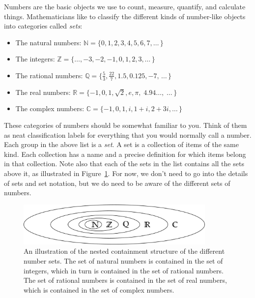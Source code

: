 		Numbers are the basic objects we use to count, measure, quantify, and calculate things.
		Mathematicians like to classify the different kinds of number-like objects into categories called \emph{sets}:					
		\begin{itemize}
			\item  The natural numbers: $\mathbb{N} = \{0,1,2,3,4,5,6,7, \ldots \, \}$
			\item  The integers: $\mathbb{Z} = \{\ldots, -3,-2,-1,0,1,2,3 , \ldots  \, \}$
			\item  The rational numbers: $\mathbb{Q} = \{\frac{5}{3}, \frac{22}{7}, 1.5, 0.125,  -7, \, \ldots \, \}$
			\item  The real numbers: $\mathbb{R} = \{-1,0,1, \sqrt{2}, e,\pi, \;  4.94\ldots, \; \ldots \, \}$
			\item  The complex numbers: $\mathbb{C} = \{ -1, 0, 1, i,  1+i, 2+3i,  \ldots \, \}$
		\end{itemize}
				These categories of numbers should be somewhat familiar to you.
		Think of them as neat classification labels for everything that you would normally call a number. 
	 	Each group in the above list is a \emph{set}.
		A set is a collection of items of the same kind. 
		Each collection has a name and a precise definition for which items belong in that collection.
		Note also that each of the sets in the list contains all the sets above it,												
		as illustrated in Figure~\ref{fig:nested_sets}.
		For now, we don't need to go into the details of sets and set notation,
		but we do need to be aware of the different sets of numbers.

		\begin{figure}[H]
			\centering
			\includegraphics[width=0.87\textwidth]{images/figures/math/nested_sets.png}
			\caption{	An illustration of the nested containment structure of the different number sets.
					The set of natural numbers is contained in the set of integers,
					which in turn is contained in the set of rational numbers.
					The set of rational numbers is contained in the set of real numbers,
					which is contained in the set of complex numbers.\label{fig:nested_sets}}
			
		\end{figure}

